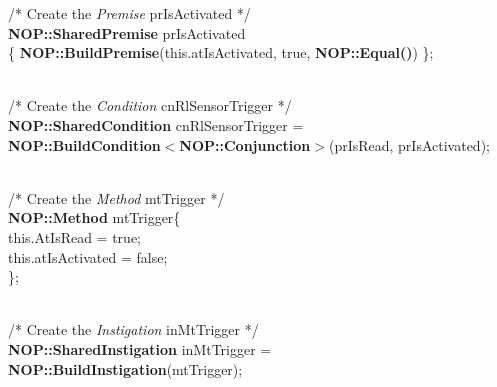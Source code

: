 \begin{algorithm*}
\begin{algorithmic}[1]
\STATE \hspace{0.1cm} /* Create the \textit{Premise} prIsActivated */ \\
\STATE \hspace{0.1cm} \textbf{NOP::SharedPremise} prIsActivated \\
\STATE \hspace{0.1cm} \{ \textbf{NOP::BuildPremise}(this.atIsActivated, true, \textbf{NOP::Equal()}) \}; \\

\STATE \texttt{\\}

\STATE \hspace{0.1cm} /* Create the \textit{Condition} cnRlSensorTrigger */ \\
\STATE \hspace{0.1cm} \textbf{NOP::SharedCondition} cnRlSensorTrigger = \\
\STATE \hspace{0.1cm}  \textbf{NOP::BuildCondition}$<$\textbf{NOP::Conjunction}$>$(prIsRead, prIsActivated); \\

\STATE \texttt{\\}

\STATE \hspace{0.1cm} /* Create the \textit{Method} mtTrigger */ \\
\STATE \hspace{0.1cm} \textbf{NOP::Method} mtTrigger\{ \\
\STATE \hspace{0.2cm} this.AtIsRead = true; \\
\STATE \hspace{0.2cm} this.atIsActivated = false; \\
\STATE \hspace{0.1cm} \}; \\

\STATE \texttt{\\}

\STATE \hspace{0.1cm} /* Create the \textit{Instigation} inMtTrigger */ \\
\STATE \hspace{0.1cm} \textbf{NOP::SharedInstigation} inMtTrigger = \\
\STATE \hspace{0.1cm} \textbf{NOP::BuildInstigation}(mtTrigger); \\

\STATE \texttt{\\}


\end{algorithmic}
\end{algorithm*}

